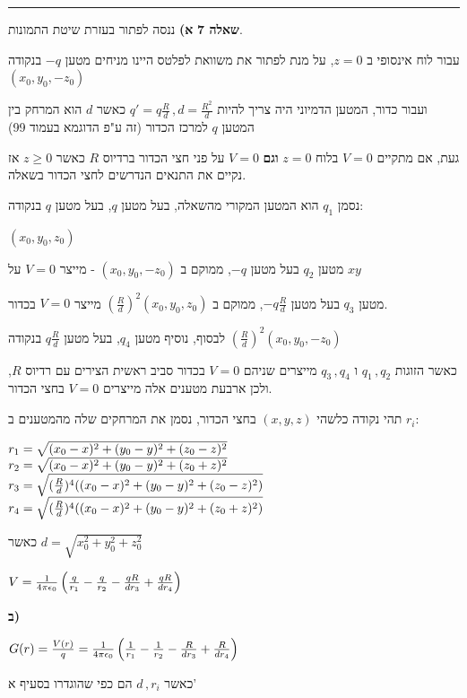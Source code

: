 \documentclass[14pt]{extarticle}
\makeatletter
\newenvironment{lefteqs}{%
    \begin{english}%
    \begin{flushleft}%
    \renewcommand{\arraystretch}{1.3}%
    $\begin{array}{@{}l@{}}%
}{%
    \end{array}$%
    \end{flushleft}%
    \end{english}%
}
\makeatother
\begin{document}
\vspace{3em}
\hrule
\vspace{2em}

\textbf{\large שאלה 7}
\textbf{א)}
ננסה לפתור בעזרת שיטת התמונות.

עבור לוח אינסופי ב $z=0$, על מנת לפתור את משוואת לפלטס היינו מניחים מטען $-q$ בנקודה $(x_0, y_0, -z_0)$

ועבור כדור, המטען הדמיוני היה  צריך להיות $q'=q\frac{R}{d} \, , d=\frac{R^2}{d}$
כאשר $d$ הוא המרחק בין המטען $q$ למרכז הכדור (זה ע"פ הדוגמא בעמוד 99)

געת, אם מתקיים $V=0$ בלוח $z=0$ \textbf{וגם} $V=0$ על פני חצי הכדור ברדיוס $R$ כאשר $z\geq 0$ אז נקיים את התנאים הנדרשים לחצי הכדור בשאלה.

נסמן $q_1$ הוא המטען המקורי מהשאלה, בעל מטען $q$, בעל מטען $q$ בנקודה:

$(x_0, y_0, z_0)$

מטען $q_2$ בעל מטען $-q$, ממוקם ב $(x_0, y_0, -z_0)$ - מייצר $V=0$ על $xy$

מטען $q_3$ בעל מטען $-q\frac{R}{d}$, ממוקם ב $(\frac{R}{d})^2 (x_0,y_0,z_0)$ מייצר $V=0$ בכדור.

לבסוף, נוסיף מטען $q_4$, בעל מטען $q\frac{R}{d}$ בנקודה $(\frac{R}{d})^2 (x_0,y_0,-z_0)$

כאשר הזוגות $q_1 \, , q_2$ ו $q_3 \, , q_4$ מייצרים שניהם $V=0$ בכדור סביב ראשית הצירים עם רדיוס $R$,
ולכן ארבעת מטענים אלה מייצרים $V=0$ בחצי הכדור.

תהי נקודה כלשהי $(x,y,z)$ בחצי הכדור, נסמן את המרחקים שלה מהמטענים ב $r_i$:

\begin{lefteqs}
    r_1 = \sqrt{(x_0 - x)^2 + (y_0 - y)^2 + (z_0 - z)^2} \\
    r_2 = \sqrt{(x_0 - x)^2 + (y_0 - y)^2 + (z_0 + z)^2} \\
    r_3 = \sqrt{(\frac{R}{d})^4 ((x_0 - x)^2 + (y_0 - y)^2 + (z_0 - z)^2)} \\
    r_4 = \sqrt{(\frac{R}{d})^4 ((x_0 - x)^2 + (y_0 - y)^2 + (z_0 + z)^2)} \\
\end{lefteqs}

כאשר $d=\sqrt{x_0^2 + y_0^2 + z_0^2}$

\begin{lefteqs}
    V = \frac{1}{4\pi \epsilon_0} \left( \frac{q}{r_1} - \frac{q}{r_2} - \frac{qR}{dr_3} + \frac{qR}{dr_4} \right)
\end{lefteqs}

\textbf{ב)}
\begin{lefteqs}
    G(r) = \frac{V(r)}{q} = \frac{1}{4\pi \epsilon_0} \left( \frac{1}{r_1} - \frac{1}{r_2} - \frac{R}{dr_3} + \frac{R}{dr_4} \right) \\
\end{lefteqs}
כאשר $d \, , r_i$ הם כפי שהוגדרו בסעיף א'
\end{document}
